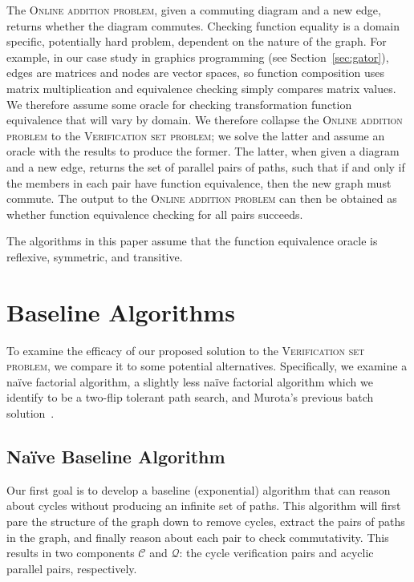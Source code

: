 \documentclass[sigplan]{acmart}
\begin{document}
The \textsc{Online addition problem}, given a commuting diagram and a new edge, returns whether the diagram commutes.
Checking function equality is a domain specific, potentially hard problem, dependent on the nature of the graph.
For example, in our case study in graphics programming (see Section~\ref{sec:gator}), edges are matrices and nodes are vector spaces, so function composition uses matrix multiplication and equivalence checking simply compares matrix values.
We therefore assume some oracle for checking transformation function equivalence that will vary by domain.
%
We therefore collapse the \textsc{Online addition problem} to the \textsc{Verification set problem}; we solve the latter and assume an oracle with the results to produce the former.
The latter, when given a diagram and a new edge, returns the set of parallel pairs of paths, such that if and only if the members in each pair have function equivalence, then the new graph must commute.
The output to the \textsc{Online addition problem} can then be obtained as whether function equivalence checking for all pairs succeeds.

The algorithms in this paper assume that the function equivalence oracle is reflexive, symmetric, and transitive.

\section{Baseline Algorithms}

To examine the efficacy of our proposed solution to the \textsc{Verification set problem}, we compare it to some potential alternatives.
Specifically, we examine a na\"{i}ve factorial algorithm, a slightly less na\"{i}ve factorial algorithm which we identify to be a two-flip tolerant path search, and Murota's previous batch solution~\cite{commutative}.

\subsection{Na\"{i}ve Baseline Algorithm}
Our first goal is to develop a baseline (exponential) algorithm that can reason about cycles without producing an infinite set of paths.  This algorithm will first pare the structure of the graph down to remove cycles, extract the pairs of paths in the graph, and finally reason about each pair to check commutativity.  This results in two components $\mathcal{C}$ and $\mathcal{Q}$: the cycle verification pairs and acyclic parallel pairs, respectively.
\end{document}
